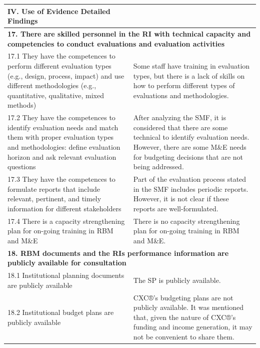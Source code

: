 \documentclass[
  10pt,
]{book}
\begin{document}
\begin{table}
\centering
\begin{tabular}[t]{l|l}
\hline
IV. Use of Evidence Detailed Findings &  \\
\hline
\multicolumn{2}{l}{\textbf{17. There are skilled personnel in the RI with technical capacity and competencies to conduct evaluations and evaluation activities}}\\
\hline
\hspace{1em}17.1 They have the competences to perform different evaluation types (e.g., design, process, impact) and use different methodologies (e.g., quantitative, qualitative, mixed methods) & Some staff have training in evaluation types, but there is a lack of skills on how to perform different types of evaluations and methodologies.\\
\hline
\hspace{1em}17.2 They have the competences to identify evaluation needs and match them with proper evaluation types and methodologies: define evaluation horizon and ask relevant evaluation questions & After analyzing the SMF, it is considered that there are some technical to identify evaluation needs. However, there are some M\&E needs for budgeting decisions that are not being addressed.\\
\hline
\hspace{1em}17.3 They have the competences to formulate reports that include relevant, pertinent, and timely information for different stakeholders & Part of the evaluation process stated in the SMF includes periodic reports. However, it is not clear if these reports are well-formulated.\\
\hline
\hspace{1em}17.4 There is a capacity strengthening plan for on-going training in RBM and M\&E & There is no capacity strengthening plan for on-going training in RBM and M\&E.\\
\hline
\multicolumn{2}{l}{\textbf{18. RBM documents and the RIs performance information are publicly available for consultation}}\\
\hline
\hspace{1em}\hspace{1em}18.1 Institutional planning documents are publicly available & The SP is publicly available.\\
\hline
\hspace{1em}18.2 Institutional budget plans are publicly available & CXC®’s budgeting plans are not publicly available. It was mentioned that, given the nature of CXC®’s funding and income generation, it may not be convenient to share them.\\

\end{tabular}
\end{table}
\end{document}
